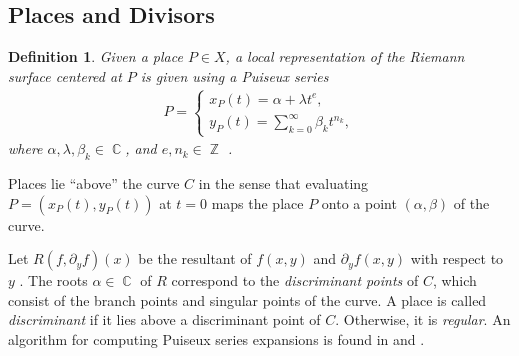 \documentclass[12pt]{article}
\newtheorem{definition}[theorem]{Definition}
\theoremstyle{definition}
\DeclareMathOperator{\ZZ}{\mathbb{Z}}
\DeclareMathOperator{\CC}{\mathbb{C}}
\begin{document}
\subsection{Places and Divisors}


\begin{definition}\label{def:puiseux}
Given a place $P \in X$, a local representation of the Riemann surface
centered at $P$ is given using a Puiseux series
\begin{align} \label{eqn:puiseux}
  P =
  \begin{cases}
    x_P(t) = \alpha + \lambda t^e, \\
    y_P(t) = \sum_{k=0}^\infty \beta_k t^{n_k},
  \end{cases}
\end{align}
where $\alpha, \lambda, \beta_k \in \CC$, and $e, n_k \in \ZZ$
\cite{bliss}.
\end{definition}
\noindent Places lie ``above'' the curve $C$ in the sense that
evaluating $P = (x_P(t), y_P(t))$ at $t=0$ maps the place $P$ onto a
point $(\alpha,\beta)$ of the curve.

Let $R(f,\partial_y f)(x)$ be the resultant of $f(x,y)$ and $\partial_y
f(x,y)$ with respect to $y$ \cite{Griffiths89}. The roots $\alpha \in
\CC$ of $R$ correspond to the {\it discriminant points} of $C$, which
consist of the branch points and singular points of the curve. A place
is called {\it discriminant} if it lies above a discriminant point of
$C$. Otherwise, it is {\it regular}. An algorithm for computing Puiseux
series expansions is found in \cite{Duval89} and
\cite{PoteauxRybowicz08}.
\end{document}
